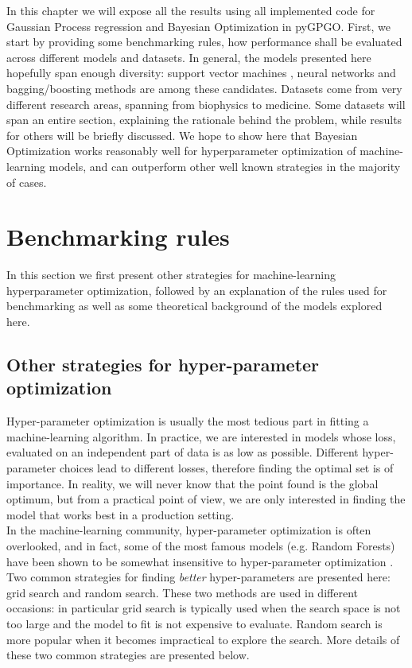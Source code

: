 \documentclass[10pt,a4paper,twoside]{book}
\begin{document}
In this chapter we will expose all the results using all implemented code for Gaussian Process regression and Bayesian Optimization in pyGPGO. First, we start by providing some benchmarking rules, how performance shall be evaluated across different models and datasets. In general, the models presented here hopefully span enough diversity: support vector machines , neural networks and bagging/boosting methods are among these candidates. Datasets come from very different research areas, spanning from biophysics to medicine. Some datasets will span an entire section, explaining the rationale behind the problem, while results for others will be briefly discussed. We hope to show here that Bayesian Optimization works reasonably well for hyperparameter optimization of machine-learning models, and can outperform other well known strategies in the majority of cases.


\section{Benchmarking rules}

In this section we first present other strategies for machine-learning hyperparameter optimization, followed by an explanation of the rules used for benchmarking as well as some theoretical background of the models explored here.

\subsection{Other strategies for hyper-parameter optimization}

Hyper-parameter optimization is usually the most tedious part in fitting a machine-learning algorithm. In practice, we are interested in models whose loss, evaluated on an independent part of data is as low as possible. Different hyper-parameter choices lead to different losses, therefore finding the optimal set is of importance. In reality, we will never know that the point found is the global optimum, but from a practical point of view, we are only interested in finding the model that works best in a production setting.\\

In the machine-learning community, hyper-parameter optimization is often overlooked, and in fact, some of the most famous models (e.g. Random Forests) have been shown to be somewhat insensitive to hyper-parameter optimization \cite{Verikas2011}. Two common strategies for finding \textit{better} hyper-parameters are presented here: grid search and random search. These two methods are used in different occasions: in particular grid search is typically used when the search space is not too large and the model to fit is not expensive to evaluate. Random search is more popular when it becomes impractical to explore the search. More details of these two common strategies are presented below. 
\end{document}
